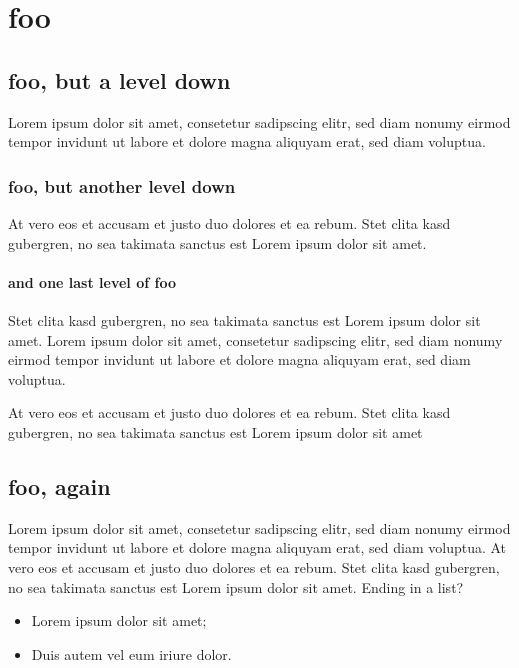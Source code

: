 \documentclass[10pt,twoside,twocolumn,openany,nodeprecatedcode]{dndbook}
\begin{document}
\section{foo}

\subsection{foo, but a level down}

Lorem ipsum dolor sit amet, consetetur sadipscing elitr, sed diam nonumy eirmod tempor invidunt ut labore et dolore magna aliquyam erat, sed diam voluptua. 

\subsubsection{foo, but another level down}

At vero eos et accusam et justo duo dolores et ea rebum. Stet clita kasd gubergren, no sea takimata sanctus est Lorem ipsum dolor sit amet.

\paragraph{and one last level of foo}

Stet clita kasd gubergren, no sea takimata sanctus est Lorem ipsum dolor sit amet. Lorem ipsum dolor sit amet, consetetur sadipscing elitr, sed diam nonumy eirmod tempor invidunt ut labore et dolore magna aliquyam erat, sed diam voluptua.

At vero eos et accusam et justo duo dolores et ea rebum. Stet clita kasd gubergren, no sea takimata sanctus est Lorem ipsum dolor sit amet

\subsection{foo, again}

Lorem ipsum dolor sit amet, consetetur sadipscing elitr, sed diam nonumy eirmod tempor invidunt ut labore et dolore magna aliquyam erat, sed diam voluptua. At vero eos et accusam et justo duo dolores et ea rebum. Stet clita kasd gubergren, no sea takimata sanctus est Lorem ipsum dolor sit amet. Ending in a list?

\begin{itemize}

\item Lorem ipsum dolor sit amet;
\item Duis autem vel eum iriure dolor.
\end{itemize}
\end{document}
